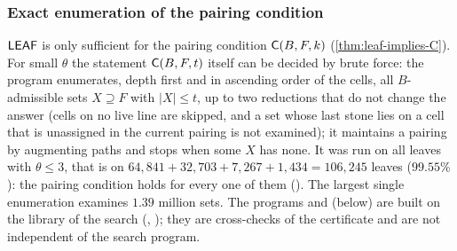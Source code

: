 \subsubsection*{Exact enumeration of the pairing condition}
$\mathsf{LEAF}$ is only sufficient for the pairing condition $\mathsf{C}(B,F,k)$ (\cref{thm:leaf-implies-C}). For small
$\theta$ the statement $\mathsf{C}(B,F,t)$ itself can be decided by brute force: the program 
enumerates, depth first and in ascending order of the cells, all $B$-admissible sets $X\supseteq F$ with
$|X|\le t$, up to two reductions that do not change the answer (cells on no live line are skipped, and
a set whose last stone lies on a cell that is unassigned in the current pairing is not examined); it
maintains a pairing by augmenting paths and stops when some $X$ has none. It was run on all
leaves with $\theta\le3$, that is on $64{,}841+32{,}703+7{,}267+1{,}434=106{,}245$ leaves ($99.55\%$): the
pairing condition holds for every one of them (). The
largest single enumeration examines $1.39$ million sets. The programs  and
 (below) are built on the library of the search (, );
they are cross-checks of the certificate and are not independent of the search program.

